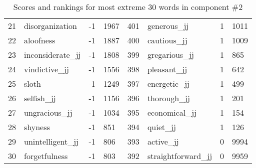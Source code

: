\begin{table}[tbp]
\begin{tabular}{| rlr@{.}l | rlr@{.}l |}
    21 & disorganization & -1 & 1967    &    401 & generous\_jj & 1 & 1011 \\
    22 & aloofness & -1 & 1887    &    400 & cautious\_jj & 1 & 1009 \\
    23 & inconsiderate\_jj & -1 & 1808    &    399 & gregarious\_jj & 1 & 865 \\
    24 & vindictive\_jj & -1 & 1556    &    398 & pleasant\_jj & 1 & 642 \\
    25 & sloth & -1 & 1249    &    397 & energetic\_jj & 1 & 499 \\
    26 & selfish\_jj & -1 & 1156    &    396 & thorough\_jj & 1 & 201 \\
    27 & ungracious\_jj & -1 & 1034    &    395 & economical\_jj & 1 & 154 \\
    28 & shyness & -1 & 851    &    394 & quiet\_jj & 1 & 126 \\
    29 & unintelligent\_jj & -1 & 806    &    393 & active\_jj & 0 & 9994 \\
    30 & forgetfulness & -1 & 803    &    392 & straightforward\_jj & 0 & 9959 \\
    \hline
    \end{tabular}
    \caption{Scores and rankings for most extreme 30 words in component \#2} 
\end{table}
\clearpage
